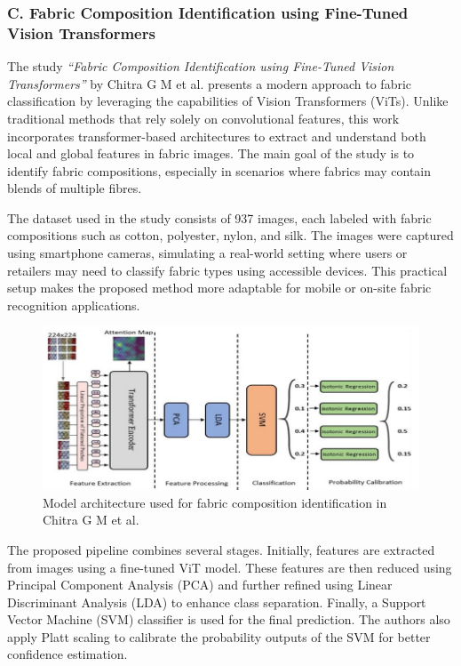 \subsubsection{C. Fabric Composition Identification using Fine-Tuned Vision Transformers~\cite{chitra2023fabric}}

The study \textit{“Fabric Composition Identification using Fine-Tuned Vision Transformers”} by Chitra G M et al. presents a modern approach to fabric classification by leveraging the capabilities of Vision Transformers (ViTs). Unlike traditional methods that rely solely on convolutional features, this work incorporates transformer-based architectures to extract and understand both local and global features in fabric images. The main goal of the study is to identify fabric compositions, especially in scenarios where fabrics may contain blends of multiple fibres.

The dataset used in the study consists of 937 images, each labeled with fabric compositions such as cotton, polyester, nylon, and silk. The images were captured using smartphone cameras, simulating a real-world setting where users or retailers may need to classify fabric types using accessible devices. This practical setup makes the proposed method more adaptable for mobile or on-site fabric recognition applications.

\begin{figure}[H]
    \centering
    \begin{minipage}{1\linewidth}
        \includegraphics[width=\linewidth]{images/Paper3Model.png}
    \end{minipage}
    \caption[Model architecture - Chitra G M et al.~\cite{chitra2023fabric}]{Model architecture used for fabric composition identification in Chitra G M et al.~\cite{chitra2023fabric}}
\end{figure}

The proposed pipeline combines several stages. Initially, features are extracted from images using a fine-tuned ViT model. These features are then reduced using Principal Component Analysis (PCA) and further refined using Linear Discriminant Analysis (LDA) to enhance class separation. Finally, a Support Vector Machine (SVM) classifier is used for the final prediction. The authors also apply Platt scaling to calibrate the probability outputs of the SVM for better confidence estimation.

